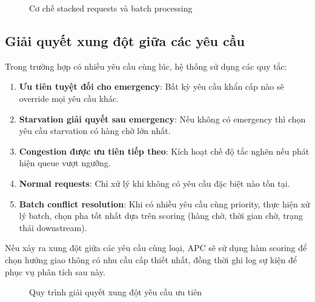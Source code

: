 \begin{figure}[H]
    \centering
    \caption{Cơ chế stacked requests và batch processing}
    \label{fig:stacked_requests_diagram}
\end{figure}

\subsection{Giải quyết xung đột giữa các yêu cầu}

Trong trường hợp có nhiều yêu cầu cùng lúc, hệ thống sử dụng các quy tắc:
\begin{enumerate}
    \item \textbf{Ưu tiên tuyệt đối cho emergency}: Bất kỳ yêu cầu khẩn cấp nào sẽ override mọi yêu cầu khác.
    \item \textbf{Starvation giải quyết sau emergency}: Nếu không có emergency thì chọn yêu cầu starvation có hàng chờ lớn nhất.
    \item \textbf{Congestion được ưu tiên tiếp theo}: Kích hoạt chế độ tắc nghẽn nếu phát hiện queue vượt ngưỡng.
    \item \textbf{Normal requests}: Chỉ xử lý khi không có yêu cầu đặc biệt nào tồn tại.
    \item \textbf{Batch conflict resolution}: Khi có nhiều yêu cầu cùng priority, thực hiện xử lý batch, chọn pha tốt nhất dựa trên scoring (hàng chờ, thời gian chờ, trạng thái downstream).
\end{enumerate}

Nếu xảy ra xung đột giữa các yêu cầu cùng loại, APC sẽ sử dụng hàm scoring để chọn hướng giao thông có nhu cầu cấp thiết nhất, đồng thời ghi log sự kiện để phục vụ phân tích sau này.

\begin{figure}[H]
    \centering
    \caption{Quy trình giải quyết xung đột yêu cầu ưu tiên}
    \label{fig:conflict_resolution_flow}
\end{figure}

